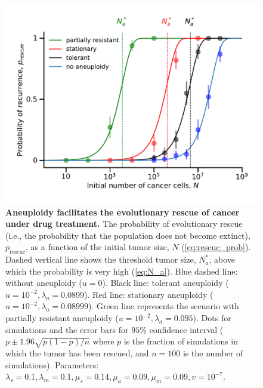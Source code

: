\documentclass[12pt]{extarticle}
\newcommand{\presc}{p_\text{rescue}}
\begin{document}
\begin{figure}
\includegraphics[width=1\textwidth]{Figures/ProbvNPlot.pdf}
\caption{\textbf{Aneuploidy facilitates the evolutionary rescue of cancer under drug treatment.}
The probability of evolutionary rescue (i.e., the probability that the population does not become extinct), $\presc$, as a function of the initial tumor size, $N$ (\cref{eq:rescue_prob}). Dashed vertical line shows the threshold tumor size, $N_a^*$, above which the probability is very high (\cref{eq:N_a}). Blue dashed line: without aneuploidy ($u=0$). Black line: tolerant aneuploidy ($u=10^{-2}, \lambda_a=0.0899$). Red line: stationary aneuploidy ($u=10^{-2}, \lambda_a=0.08999$). Green line represents the scenario with partially resistant aneuploidy ($u=10^{-2}, \lambda_a=0.095$). Dots for simulations and the error bars for $95\%$ confidence interval ($p\pm1.96\sqrt{p\left(1-p\right)/n}$ where $p$ is the fraction of simulations in which the tumor has been rescued, and $n=100$ is the number of simulations). Parameters: $\lambda_s=0.1,\lambda_m=0.1,\mu_s=0.14,\mu_a=0.09,\mu_m=0.09, v=10^{-7}$.}
\label{rescue_prob}
\end{figure}
\end{document}
